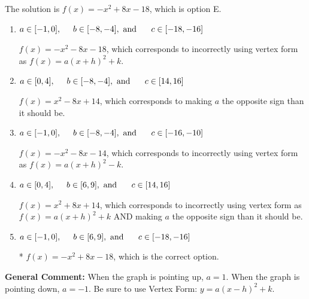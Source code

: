 \documentclass{extbook}[14pt]
\begin{document}
\begin{enumerate}
{The solution is \( f(x) = -x^{2} +8 x -18 \), which is option E.\begin{enumerate}[label=\Alph*.]
\item \( a \in [-1, 0], \hspace*{5mm} b \in [-8, -4], \text{ and } \hspace*{5mm} c \in [-18, -16] \)

$f(x)=-x^{2} -8 x -18$, which corresponds to incorrectly using vertex form as $f(x) = a(x+h)^2+k$.
\item \( a \in [0, 4], \hspace*{5mm} b \in [-8, -4], \text{ and } \hspace*{5mm} c \in [14, 16] \)

$f(x)=x^{2} -8 x + 14$, which corresponds to making $a$ the opposite sign than it should be.
\item \( a \in [-1, 0], \hspace*{5mm} b \in [-8, -4], \text{ and } \hspace*{5mm} c \in [-16, -10] \)

$f(x)=-x^{2} -8 x -14$, which corresponds to incorrectly using vertex form as $f(x) = a(x+h)^2 - k$.
\item \( a \in [0, 4], \hspace*{5mm} b \in [6, 9], \text{ and } \hspace*{5mm} c \in [14, 16] \)

$f(x)=x^{2} +8 x + 14$, which corresponds to incorrectly using vertex form as $f(x) = a(x+h)^2+k$ AND making $a$ the opposite sign than it should be.
\item \( a \in [-1, 0], \hspace*{5mm} b \in [6, 9], \text{ and } \hspace*{5mm} c \in [-18, -16] \)

* $f(x)=-x^{2} +8 x -18$, which is the correct option.
\end{enumerate}

\textbf{General Comment:} When the graph is pointing up, $a=1$. When the graph is pointing down, $a=-1$. Be sure to use Vertex Form: $y = a(x-h)^2+k$.
}
\end{enumerate}
\end{document}
